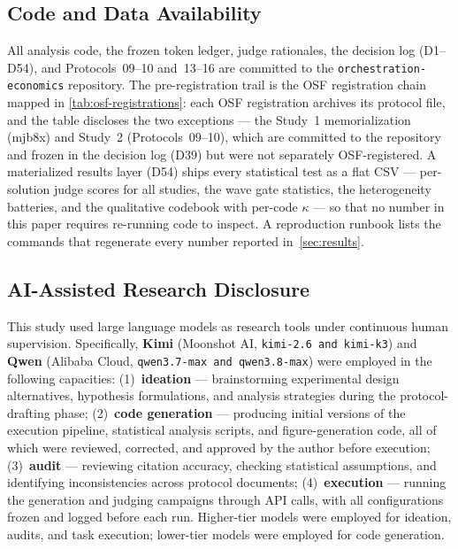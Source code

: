 \documentclass[12pt,a4paper]{article}
\begin{document}
\subsection{Code and Data Availability}
All analysis code, the frozen token ledger, judge rationales, the decision log
(D1--D54), and Protocols~09--10 and~13--16 are committed to the
\texttt{orchestration-economics} repository. The pre-registration trail is the
OSF registration chain mapped in \cref{tab:osf-registrations}: each OSF
registration archives its protocol file, and the table discloses the two
exceptions --- the Study~1 memorialization (mjb8x) and Study~2
(Protocols~09--10), which are committed to the repository and frozen in the
decision log (D39) but were not separately OSF-registered.
A materialized results layer (D54) ships every statistical test as a flat CSV
--- per-solution judge scores for all studies, the wave gate statistics, the
heterogeneity batteries, and the qualitative codebook with per-code $\kappa$
--- so that no number in this paper requires re-running code to inspect.
A reproduction runbook
\citep{SandveEtAl2013} lists the commands that regenerate every number reported
in~\cref{sec:results}.

\subsection{AI-Assisted Research Disclosure}\label{sec:ai-disclosure}

This study used large language models as research tools under continuous human
supervision. Specifically, \textbf{Kimi} (Moonshot AI, \texttt{kimi-2.6 and kimi-k3}) and
\textbf{Qwen} (Alibaba Cloud, \texttt{qwen3.7-max and qwen3.8-max}) were employed in the
following capacities: (1)~\textbf{ideation} --- brainstorming experimental
design alternatives, hypothesis formulations, and analysis strategies during the
protocol-drafting phase; (2)~\textbf{code generation} --- producing initial
versions of the execution pipeline, statistical analysis scripts, and
figure-generation code, all of which were reviewed, corrected, and approved by
the author before execution; (3)~\textbf{audit} --- reviewing citation accuracy,
checking statistical assumptions, and identifying inconsistencies across
protocol documents; (4)~\textbf{execution} --- running the generation and
judging campaigns through API calls, with all configurations frozen and logged
before each run. Higher-tier models were employed for ideation, audits, and
task execution; lower-tier models were employed for code generation.
\end{document}
